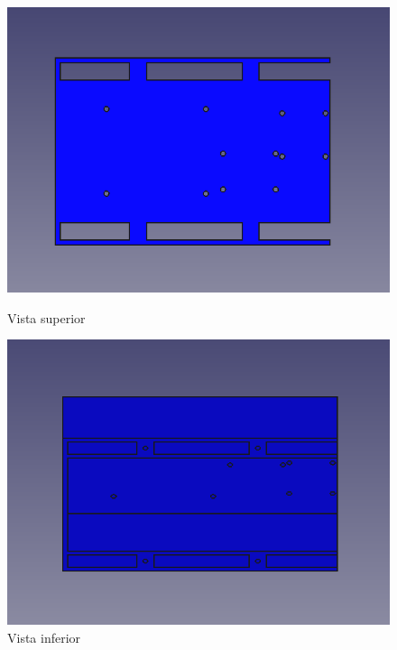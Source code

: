 \begin{figure}[ht!]
	\centering
	\begin{minipage}{0.45\linewidth}
		\centering
		\includegraphics[width=\linewidth]{figs/cap5/superior1.png}
		\caption*{\centering Vista superior}
	\end{minipage}
	\hspace{1cm}
	\begin{minipage}{0.45\linewidth}
		\centering
		\includegraphics[width=\linewidth]{figs/cap5/superior2.png}
		\caption*{\centering Vista inferior}
	\end{minipage}
	\hspace{1cm}
	\begin{minipage}{0.45\linewidth}
		\centering

\end{minipage}
\end{figure}
